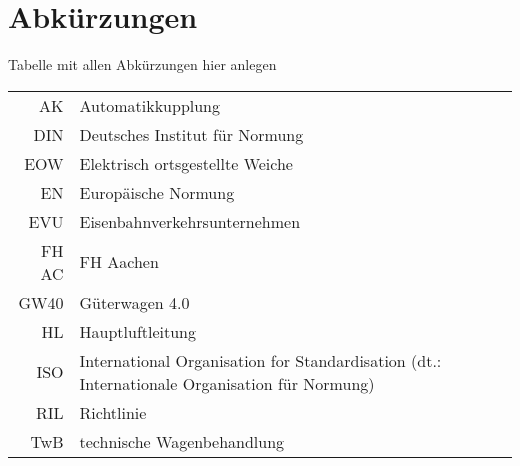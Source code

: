 \section{Abkürzungen}
Tabelle mit allen Abkürzungen hier anlegen\\
\begin{tabular}[c]{r|p{12cm}l}
	\hline
	AK		& 	Automatikkupplung	\\
	
	DIN		&	Deutsches Institut für Normung	\\
	
	EOW     &   Elektrisch ortsgestellte Weiche\\
	EN		&	Europäische Normung	\\
	EVU		&	Eisenbahnverkehrsunternehmen\\
	
	FH AC 	& 	FH Aachen			\\
	
	GW40	&	Güterwagen 4.0		\\
	
	HL		&	Hauptluftleitung	\\
	
	ISO		&	International Organisation for Standardisation	(dt.: Internationale Organisation für Normung)\\
	
	RIL		&	Richtlinie			\\
	
	TwB		&	technische Wagenbehandlung	\\
	
	
	
	\hline
\end{tabular}